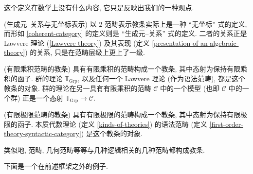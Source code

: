 这个定义在数学上没有什么内容, 它只是反映出我们的一种观点.

\begin{remark}
	{(生成元--关系与无坐标表示)}
	以 $2$-范畴表示教条实际上是一种 ``无坐标'' 式的定义, 而形如 \ref{coherent-category} 的定义则是 ``生成元--关系'' 式的定义. 二者的关系正是 Lawvere 理论 (\ref{Lawvere-theory}) 及其表现 (定义 \ref{presentation-of-an-algebraic-theory}) 的关系, 只是在范畴层级上更上了一级.
\end{remark}

\begin{example}
	{(有限乘积范畴的教条)}
	具有有限乘积的范畴构成一个教条, 其中态射为保持有限乘积的函子. 群的理论 $\mathbb T_{\text{Grp}}$, 以及任何一个 Lawvere 理论 (作为语法范畴), 都是这个教条的对象. 群的理论在另一具有有限乘积的范畴 $\mathcal C$ 中的一个模型 (也即 $\mathcal C$ 中的一个群) 正是一个态射 $\mathbb T_{\text{Grp}} \to \mathcal C$.
\end{example}

\begin{example}
	{(有限极限范畴的教条)}
	具有有限极限的范畴构成一个教条, 其中态射为保持有限极限的函子. 本质代数理论 (定义 \ref{kinds-of-theories}) 的语法范畴 (定义 \ref{first-order-theory-syntactic-category}) 是这个教条的对象.
\end{example}

类似地, \regular{}范畴, 几何范畴等等与几种逻辑相关的几种范畴都构成教条. %

下面是一个在前述框架之外的例子.

